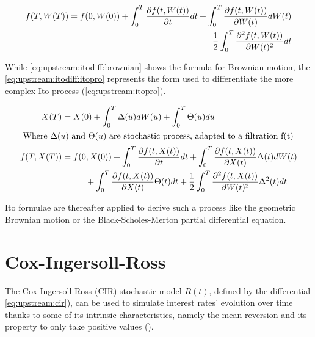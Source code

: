 \documentclass[12pt]{report}
\begin{document}
\begin{align}
  f(T, W(T)) = f(0, W(0))
               + \int_0^T \frac{\partial f(t, W(t))}{\partial t} dt
               + \int_0^T \frac{\partial f(t, W(t))}{\partial W(t)} dW(t)\notag\\
    \mspace{150mu} + \frac{1}{2} \int_0^T \frac{\partial^2 f(t, W(t))}{\partial W(t)^2} dt \label{eq:upstream:itodiff:brownian}
\end{align}

While \cref{eq:upstream:itodiff:brownian} shows the formula for Brownian motion, the \cref{eq:upstream:itodiff:itopro} represents the form used to differentiate the more complex Ito process (\ref{eq:upstream:itopro}).

\begin{align}
  X(T) &= X(0)
         + \int_0^T \Delta(u) dW(u)
         + \int_0^T \Theta(u) du \label{eq:upstream:itopro} \\
  \intertext{
  Where $\Delta(u)$ and $\Theta(u)$ are stochastic process, adapted to a filtration f(t)
  }
  f(T, X(T)) &= f(0, X(0))
               + \int_0^T \frac{\partial f(t, X(t))}{\partial t} dt
               + \int_0^T \frac{\partial f(t, X(t))}{\partial X(t)} \Delta(t) dW(t)\notag\\
    &\mspace{50mu} + \int_0^T \frac{\partial f(t, X(t))}{\partial X(t)} \Theta(t) dt
    + \frac{1}{2} \int_0^T \frac{\partial^2 f(t, X(t))}{\partial W(t)^2} \Delta^2(t)dt \label{eq:upstream:itodiff:itopro}
\end{align}

Ito formulae are thereafter applied to derive such a process like the geometric Brownian motion or the Black-Scholes-Merton partial differential equation. 







\section{Cox-Ingersoll-Ross}
\label{sec:CoxIngersollRoss}

The Cox-Ingersoll-Ross (CIR) stochastic model $R(t)$, defined by the differential \cref{eq:upstream:cir}), can be used to simulate interest rates' evolution over time thanks to some of its intrinsic characteristics, namely the mean-reversion and its property to only take positive values (\citet{shreve}).
\end{document}
